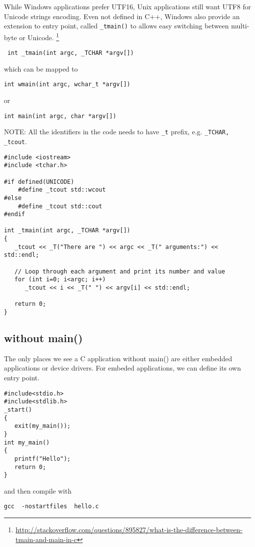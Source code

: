 While Windows applications prefer UTF16, Unix applications still want UTF8 for
Unicode strings encoding. Even not defined in C++, Windows also provide an
extension to entry point, called \verb!_tmain()! to allows easy switching
between multi-byte or Unicode.
\footnote{\url{http://stackoverflow.com/questions/895827/what-is-the-difference-between-tmain-and-main-in-c}}

\begin{verbatim}
 int _tmain(int argc, _TCHAR *argv[]) 
\end{verbatim}
which can be mapped to
\begin{verbatim}
int wmain(int argc, wchar_t *argv[])
\end{verbatim}
or
\begin{verbatim}
int main(int argc, char *argv[])
\end{verbatim}

NOTE: All the identifiers in the code needs to have \verb!_t! prefix, e.g.
\verb!_TCHAR, _tcout!. 
\begin{verbatim}
#include <iostream>
#include <tchar.h>

#if defined(UNICODE)
    #define _tcout std::wcout
#else
    #define _tcout std::cout
#endif

int _tmain(int argc, _TCHAR *argv[]) 
{
   _tcout << _T("There are ") << argc << _T(" arguments:") << std::endl;

   // Loop through each argument and print its number and value
   for (int i=0; i<argc; i++)
      _tcout << i << _T(" ") << argv[i] << std::endl;

   return 0;
}
\end{verbatim}

\subsection{without main()}
\label{sec:without_main()}

The only places we see a C application without main() are either embedded
applications or device drivers. For embeded applications, we can define its own
entry point.
\begin{verbatim}
#include<stdio.h>
#include<stdlib.h>
_start()
{
   exit(my_main());
}
int my_main()
{
   printf("Hello");
   return 0;
}
\end{verbatim}
and then compile with
\begin{verbatim}
gcc  -nostartfiles  hello.c 
\end{verbatim}


